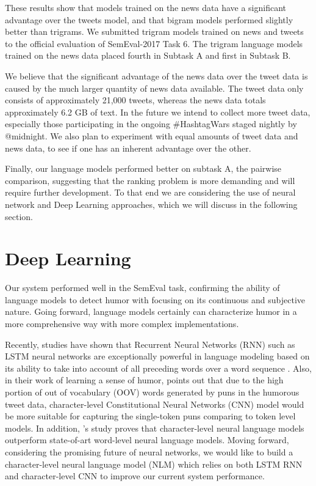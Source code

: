 \documentclass[11pt,a4paper]{article}
\begin{document}
These results show that models trained on the news data
have a significant advantage over the tweets model, and that bigram
models performed slightly better than trigrams. We submitted
trigram models trained on news and tweets to the official evaluation 
of SemEval-2017 Task 6. The trigram language models trained on
the news data placed fourth in Subtask A and first in Subtask B.

We believe that the significant advantage of the news data over 
the tweet data is caused by the much larger quantity of news data
available. The tweet data only consists of approximately 21,000 tweets,
whereas the news data totals approximately 6.2 GB of text.
In the future we intend to collect more tweet data, especially those 
participating in the ongoing \#HashtagWars staged nightly by @midnight. 
We also plan to experiment with equal amounts of tweet data and
news data, to see if one has an inherent advantage over the other.

Finally, our language models performed better on subtask A, the pairwise
comparison, suggesting that the ranking problem is more demanding
and will require further development. To that end we are considering the
use of neural network and Deep Learning approaches, which we will 
discuss in the following section.

\section{Deep Learning}

Our system performed well in the SemEval task, confirming the ability 
of language models to detect humor with focusing on its continuous 
and subjective nature. Going forward, language models certainly 
can characterize humor in a more comprehensive way with more 
complex implementations.

Recently, studies have shown that Recurrent Neural Networks 
(RNN) such as LSTM neural networks are exceptionally powerful 
in language modeling based on its ability to take into account 
of all preceding words over a word sequence \cite{LSTM1} 
\cite{LSTM2}. Also, in their work of learning a sense of humor, 
\cite{2016hashtagwars} points out that due to the high portion 
of out of vocabulary (OOV) words generated by puns in the 
humorous tweet data, character-level Constitutional Neural 
Networks (CNN) model would be more suitable for capturing the 
single-token puns comparing to token level models. In addition, 
\cite{CNN}'s study proves that character-level neural language 
models outperform state-of-art word-level neural language 
models. Moving forward, considering the promising future of 
neural networks, we would like to build a character-level neural 
language model (NLM) which relies on both LSTM RNN and character-level 
CNN to improve our current system performance.
\end{document}
